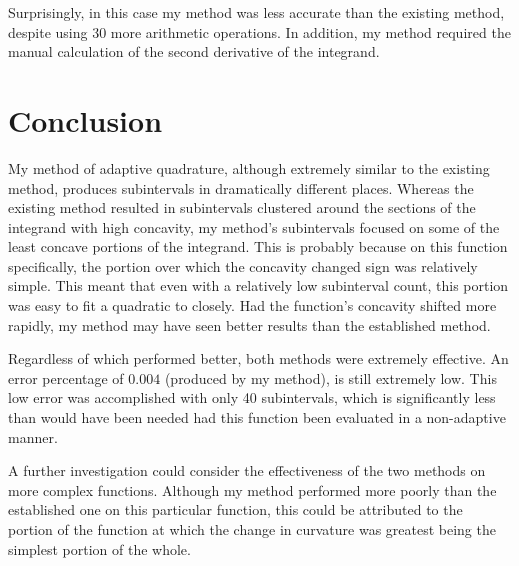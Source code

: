 \documentclass{paper}
\begin{document}
Surprisingly, in this case my method was less accurate than the existing method, despite using 30 more arithmetic operations.
In addition, my method required the manual calculation of the second derivative of the integrand.

\section{Conclusion}
\label{sec:conclusion}
My method of adaptive quadrature, although extremely similar to the existing method, produces subintervals in dramatically different places.
Whereas the existing method resulted in subintervals clustered around the sections of the integrand with high concavity, my method's subintervals focused on some of the least concave portions of the integrand.
This is probably because on this function specifically, the portion over which the concavity changed sign was relatively simple.
This meant that even with a relatively low subinterval count, this portion was easy to fit a quadratic to closely.
Had the function's concavity shifted more rapidly, my method may have seen better results than the established method.

Regardless of which performed better, both methods were extremely effective. An error percentage of \(0.004\) (produced by my method), is still extremely low.
This low error was accomplished with only 40 subintervals, which is significantly less than would have been needed had this function been evaluated in a non-adaptive manner.

A further investigation could consider the effectiveness of the two methods on more complex functions.
Although my method performed more poorly than the established one on this particular function, this could be attributed to the portion of the function at which the change in curvature was greatest being the simplest portion of the whole.

\label{mylastpage}
\newpage
{}
\listoffigures
\vspace{1cm}
\listofsnippets
\vspace{1cm}
{}
\printbibliography
\thispagestyle{frontorback}
\end{document}
